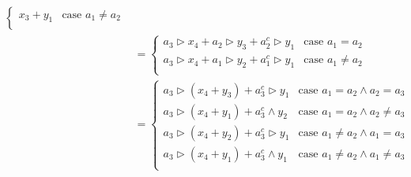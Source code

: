 \begin{equation}
\begin{split}
\begin{cases}
			x_3+y_1 & \text{case } a_1\not=a_2 \\
			\end{cases} \\
		&= \begin{cases}
			a_3\rhd x_4 + a_2\rhd y_3 + a_2^c\rhd y_1 & \text{case } a_1=a_2 \\
			a_3\rhd x_4 + a_1\rhd y_2 + a_1^c\rhd y_1 & \text{case } a_1\not=a_2 \\
			\end{cases} \\
		&= \begin{cases}
			a_3\rhd (x_4 + y_3) + a_3^c\rhd y_1 & \text{case } a_1=a_2\wedge a_2=a_3 \\
			a_3\rhd (x_4 + y_1) + a_3^c\wedge y_2 & \text{case } a_1=a_2\wedge a_2\not=a_3 \\
			a_3\rhd (x_4 + y_2) + a_3^c\rhd y_1 & \text{case } a_1\not=a_2\wedge a_1=a_3 \\
			a_3\rhd (x_4 + y_1) + a_3^c\wedge y_1 & \text{case } a_1\not=a_2\wedge a_1\not=a_3 \\
			\end{cases} \\
\end{split}\end{equation}
